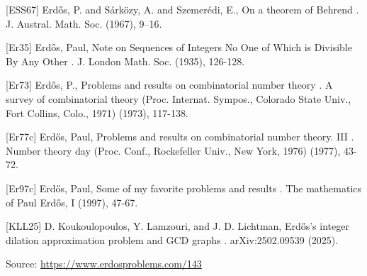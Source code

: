 \documentclass{article}
\begin{document}
[ESS67] Erd\H{o}s, P. and S\'{a}rk\"ozy, A. and Szemer\'{e}di, E., On a theorem of Behrend . J. Austral. Math. Soc. (1967), 9--16.

[Er35] Erd\H{o}s, Paul, Note on Sequences of Integers No One of Which is Divisible By Any Other . J. London Math. Soc. (1935), 126-128.

[Er73] Erd\H{o}s, P., Problems and results on combinatorial number theory . A survey of combinatorial theory (Proc. Internat. Sympos., Colorado State Univ., Fort Collins, Colo., 1971) (1973), 117-138.

[Er77c] Erd\H{o}s, Paul, Problems and results on combinatorial number theory. III . Number theory day (Proc. Conf., Rockefeller Univ., New York, 1976) (1977), 43-72.

[Er97c] Erd\H{o}s, Paul, Some of my favorite problems and results . The mathematics of Paul Erd\H{o}s, I (1997), 47-67.

[KLL25] D. Koukoulopoulos, Y. Lamzouri, and J. D. Lichtman, Erd\H{o}s's integer dilation approximation problem and GCD graphs . arXiv:2502.09539 (2025).


\bigskip
\noindent\small{Source: \url{https://www.erdosproblems.com/143}}
\end{document}
